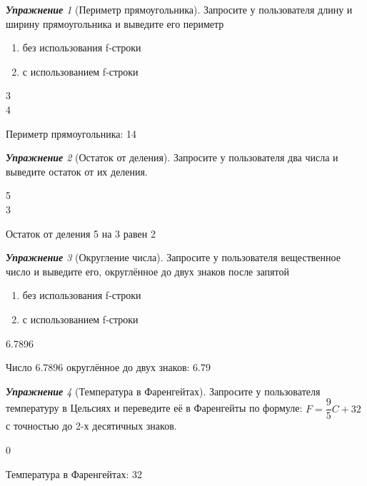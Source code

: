 \documentclass[a4,12pt]{article}
\theoremstyle{remark}
\newtheorem{exercise}{\textbf{Упражнение}}[section]
\begin{document}
\begin{exercise}[Периметр прямоугольника]
Запросите у пользователя длину и ширину прямоугольника и выведите его периметр
\begin{enumerate}[label=\textbf{\alph*)}]
    \item без использования f-строки
    \item с использованием f-строки
\end{enumerate}
\begin{inputformat}
3\\
4
\end{inputformat}
    
\begin{outputformat}
Периметр прямоугольника: 14
\end{outputformat}
\end{exercise}

\begin{exercise}[Остаток от деления]
Запросите у пользователя два числа и выведите остаток от их деления.

\begin{inputformat}
5\\
3
\end{inputformat}

\begin{outputformat}
Остаток от деления 5 на 3 равен 2
\end{outputformat}
\end{exercise}

\begin{exercise}[Округление числа]
Запросите у пользователя вещественное число и выведите его, округлённое до двух знаков после запятой
\begin{enumerate}[label=\textbf{\alph*)}]
    \item без использования f-строки
    \item с использованием f-строки
\end{enumerate}
\begin{inputformat}
6.7896
\end{inputformat}

\begin{outputformat}
Число 6.7896 округлённое до двух знаков: 6.79
\end{outputformat}
\end{exercise}

\begin{exercise}[Температура в Фаренгейтах]
Запросите у пользователя температуру в Цельсиях и переведите её в Фаренгейты по формуле: $F=\dfrac{9}{5}C + 32$ с точностью до 2-х десятичных знаков.

\begin{inputformat}
0
\end{inputformat}

\begin{outputformat}
Температура в Фаренгейтах: 32
\end{outputformat}
\end{exercise}
\end{document}
